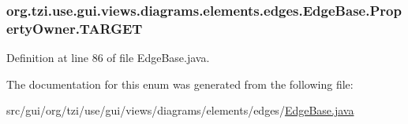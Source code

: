\hypertarget{enumorg_1_1tzi_1_1use_1_1gui_1_1views_1_1diagrams_1_1elements_1_1edges_1_1_edge_base_1_1_property_owner_a114d5b6e91ae26337782d08ecdd12088}{
\subsubsection[{T\-A\-R\-G\-E\-T}]{\setlength{\rightskip}{0pt plus 5cm}org.\-tzi.\-use.\-gui.\-views.\-diagrams.\-elements.\-edges.\-Edge\-Base.\-Property\-Owner.\-T\-A\-R\-G\-E\-T}}\label{enumorg_1_1tzi_1_1use_1_1gui_1_1views_1_1diagrams_1_1elements_1_1edges_1_1_edge_base_1_1_property_owner_a114d5b6e91ae26337782d08ecdd12088}


Definition at line 86 of file Edge\-Base.\-java.



The documentation for this enum was generated from the following file\-:\begin{DoxyCompactItemize}
\item 
src/gui/org/tzi/use/gui/views/diagrams/elements/edges/\hyperlink{_edge_base_8java}{Edge\-Base.\-java}\end{DoxyCompactItemize}
